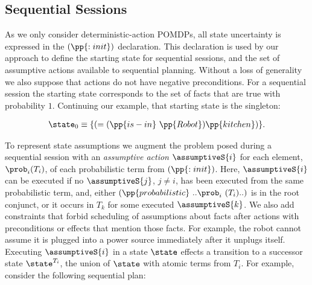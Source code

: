 \subsection{Sequential Sessions}









As we only consider deterministic-action POMDPs, all state uncertainty
is expressed in the $(\pp{:init})$ declaration. This declaration is
used by our approach to define the starting state for sequential
sessions, and the set of assumptive actions available to sequential
planning. Without a loss of generality we also suppose that actions do not have negative preconditions. For a sequential
session the starting state corresponds to the set of facts that are
true with probability $1$. Continuing our example, that starting state
is the singleton:

\small
\[
\begin{array}{l}
\state_0 \equiv \{(=(\pp{is-in}~\pp{Robot})\pp{kitchen})\}.
\end{array}
\]
\normalsize

To represent state assumptions we augment the problem posed during a
sequential session with an \emph{assumptive action} $\assumptiveS{i}$
for each element, $\prob_i (T_i)$, of each probabilistic term from
$(\pp{:init})$. Here, $\assumptiveS{i}$ can be executed if no
$\assumptiveS{j}$, $j \neq i$, has been executed from the same
probabilistic term, and, either
$(\pp{probabilistic}~..\prob_i~(T_i)..)$ is in the root conjunct, or
it occurs in $T_k$ for some executed $\assumptiveS{k}$.  We also add
constraints that forbid scheduling of assumptions about facts after
actions with preconditions or effects that mention those facts. For
example, the robot cannot assume it is plugged into a power source
immediately after it unplugs itself.  Executing $\assumptiveS{i}$ in a
state $\state$ effects a transition to a successor state
$\state^{T_i}$, the union of $\state$ with atomic terms from $T_i$.
For example, consider the following sequential plan:

